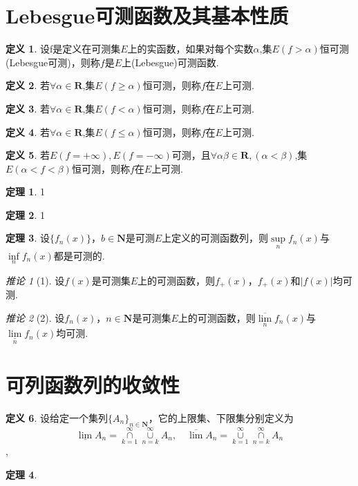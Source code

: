 \documentclass[oneside]{ctexbook}
\theoremstyle{definition} \newtheorem{defi}{定义}[section]
\theoremstyle{definition} \newtheorem{law}{定理}[section]
\theoremstyle{definition} \newtheorem{jury}{引理}[section]
\theoremstyle{remark} \newtheorem*{mar}{\heiti 推论}
\begin{document}
\section{Lebesgue可测函数及其基本性质}
\begin{defi}
	设f是定义在可测集$E$上的实函数，如果对每个实数$\alpha$,集$E(f>\alpha)$恒可测(Lebesgue可测)，则称$f$是$E$上(Lebesgue)可测函数.
\end{defi}
\begin{defi}
	若$\forall \alpha \in \textbf{R}$,集$E(f\geq\alpha)$恒可测，则称$f$在$E$上可测.
\end{defi}
\begin{defi}
	若$\forall \alpha \in \textbf{R}$,集$E(f<\alpha)$恒可测，则称$f$在$E$上可测.
\end{defi}
\begin{defi}
	若$\forall \alpha \in \textbf{R}$,集$E(f\leq\alpha)$恒可测，则称$f$在$E$上可测.
\end{defi}
\begin{defi}
	若$E(f=+\infty),E(f=-\infty)$可测，且$\forall \alpha\beta\in \textbf{R},(\alpha<\beta)$,集$E(\alpha<f<\beta)$恒可测，则称$f$在$E$上可测.
\end{defi}
\begin{law}
	1
\end{law}
\begin{law}
	1
\end{law}
\begin{law}
	设$\{f_{n}(x)\}$，$b\in\textbf{N}$是可测$E$上定义的可测函数列，则$\underset{n}{\sup}f_{n}(x)$与$\underset{n}{\inf}f_{n}(x)$都是可测的.
\end{law}
\begin{mar}[1]
	设$f(x)$是可测集$E$上的可测函数，则$f_{+}(x)$，$f_{+}(x)$和$|f(x)|$均可测.
\end{mar}
\begin{mar}[2]
	设$f_{n}(x)$，$n\in\textbf{N}$是可测集$E$上的可测函数，则$\overline{\underset{n}{\lim}}f_{n}(x)$与$\underset{n}{\underline{\lim}}f_{n}(x)$均可测.
\end{mar}
\section{可列函数列的收敛性}
\begin{defi}
	设给定一个集列$\{A_{n}\}_{n\in\textbf{N}}$，它的上限集、下限集分别定义为\[\underline{\lim}A_{n}=\underset{k=1}{\overset{\infty}{\cap}}\underset{n=k}{\overset{\infty}{\cup}}A_{n},\quad \overline{\lim}A_{n}=\underset{k=1}{\overset{\infty}{\cup}}\underset{n=k}{\overset{\infty}{\cap}}A_{n}\],
\end{defi}
\begin{law}
	
\end{law}
\end{document}
